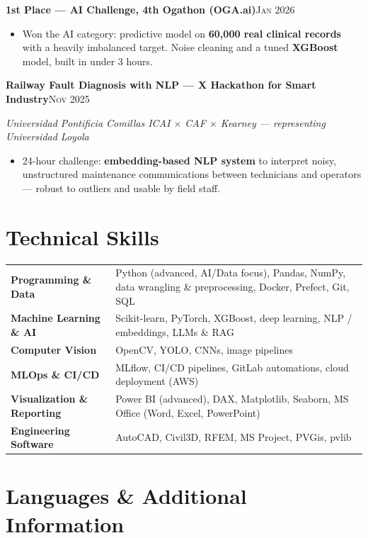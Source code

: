 \documentclass[10.5pt,a4paper]{article}
\newcommand{\entry}[2]{%
  {\textbf{#1}\hfill{\small\color{cobalt}\textsc{#2}}}\par}
\newcommand{\where}[1]{{\small\itshape\color{inkfaint}#1}\par\vspace{2pt}}
\newcommand{\skill}[1]{{\small\sffamily\bfseries\color{inksoft}#1}}
\newenvironment{bullets}
  {\begin{itemize}[leftmargin=1.15em,itemsep=1.5pt,parsep=0pt,topsep=2.5pt]
   \renewcommand\labelitemi{{\color{cobalt}\footnotesize$\bullet$}}}
  {\end{itemize}}
\begin{document}
\entry{1st Place --- AI Challenge, 4th Ogathon (OGA.ai)}{Jan 2026}
\begin{bullets}
  \item Won the AI category: predictive model on \textbf{60,000 real clinical records} with a heavily imbalanced target. Noise cleaning and a tuned \textbf{XGBoost} model, built in under 3 hours.
\end{bullets}
\vspace{5pt}

\entry{Railway Fault Diagnosis with NLP --- X Hackathon for Smart Industry}{Nov 2025}
\where{Universidad Pontificia Comillas ICAI $\times$ CAF $\times$ Kearney --- representing Universidad Loyola}
\begin{bullets}
  \item 24-hour challenge: \textbf{embedding-based NLP system} to interpret noisy, unstructured maintenance communications between technicians and operators --- robust to outliers and usable by field staff.
\end{bullets}

\section{Technical Skills}

\begin{tabularx}{\linewidth}{@{}>{\raggedright\arraybackslash\small}p{4.1cm}>{\raggedright\arraybackslash\small}X@{}}
\skill{Programming \& Data} & Python (advanced, AI/Data focus), Pandas, NumPy, data wrangling \& preprocessing, Docker, Prefect, Git, SQL \\[3pt]
\skill{Machine Learning \& AI} & Scikit-learn, PyTorch, XGBoost, deep learning, NLP / embeddings, LLMs \& RAG \\[3pt]
\skill{Computer Vision} & OpenCV, YOLO, CNNs, image pipelines \\[3pt]
\skill{MLOps \& CI/CD} & MLflow, CI/CD pipelines, GitLab automations, cloud deployment (AWS) \\[3pt]
\skill{Visualization \& Reporting} & Power BI (advanced), DAX, Matplotlib, Seaborn, MS Office (Word, Excel, PowerPoint) \\[3pt]
\skill{Engineering Software} & AutoCAD, Civil3D, RFEM, MS Project, PVGis, pvlib \\
\end{tabularx}

\section{Languages \& Additional Information}
\end{document}
